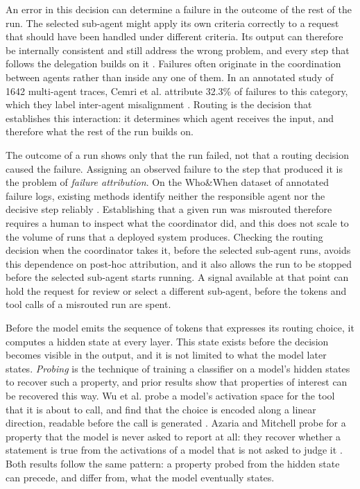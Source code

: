 An error in this decision can determine a failure in the outcome of the rest of the run. The selected sub-agent might apply its own criteria correctly to a request that should have been handled under different criteria. Its output can therefore be internally consistent and still address the wrong problem, and every step that follows the delegation builds on it \cite{zhuWhereLLMAgents2025}. Failures often originate in the coordination between agents rather than inside any one of them. In an annotated study of 1642 multi-agent traces, Cemri et al. attribute 32.3\% of failures to this category, which they label inter-agent misalignment \cite{cemriWhyMultiAgentLLM2025a}. Routing is the decision that establishes this interaction: it determines which agent receives the input, and therefore what the rest of the run builds on.

The outcome of a run shows only that the run failed, not that a routing decision caused the failure. Assigning an observed failure to the step that produced it is the problem of \emph{failure attribution}. On the Who\&When dataset of annotated failure logs, existing methods identify neither the responsible agent nor the decisive step reliably \cite{zhangWhichAgentCauses2025}. Establishing that a given run was misrouted therefore requires a human to inspect what the coordinator did, and this does not scale to the volume of runs that a deployed system produces. Checking the routing decision when the coordinator takes it, before the selected sub-agent runs, avoids this dependence on post-hoc attribution, and it also allows the run to be stopped before the selected sub-agent starts running. A signal available at that point can hold the request for review or select a different sub-agent, before the tokens and tool calls of a misrouted run are spent.

Before the model emits the sequence of tokens that expresses its routing choice, it computes a hidden state at every layer. This state exists before the decision becomes visible in the output, and it is not limited to what the model later states. \emph{Probing} is the technique of training a classifier on a model's hidden states to recover such a property, and prior results show that properties of interest can be recovered this way. Wu et al. probe a model's activation space for the tool that it is about to call, and find that the choice is encoded along a linear direction, readable before the call is generated \cite{wuToolCallingLinearly2026}. Azaria and Mitchell probe for a property that the model is never asked to report at all: they recover whether a statement is true from the activations of a model that is not asked to judge it \cite{azariaInternalStateLLM2023}. Both results follow the same pattern: a property probed from the hidden state can precede, and differ from, what the model eventually states.

